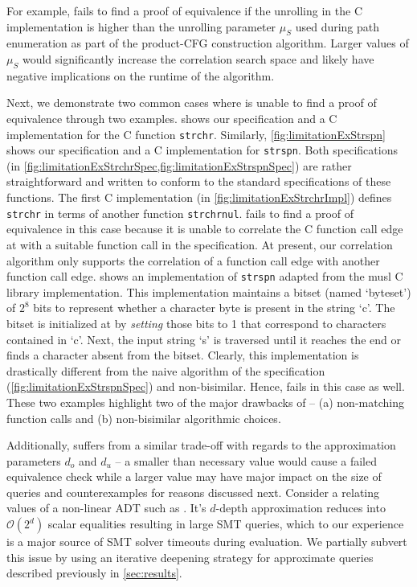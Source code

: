 For example, \toolName{} fails to find a proof of equivalence if the unrolling
in the C implementation is higher than the unrolling parameter $\mu_S$ used during path
enumeration as part of the product-CFG construction algorithm.
Larger values of $\mu_S$ would significantly increase the correlation search space and likely
have negative implications on the runtime of the algorithm.

Next, we demonstrate two common cases where \toolName{} is unable to find a proof of equivalence through two examples.
 shows our \SpecL{} specification and a C implementation for the C function {\tt strchr}.
Similarly, \cref{fig:limitationExStrspn} shows our \SpecL{} specification and a C implementation for {\tt strspn}.
Both specifications (in \cref{fig:limitationExStrchrSpec,fig:limitationExStrspnSpec}) are rather straightforward
and written to conform to the standard specifications of these functions.
The first C implementation (in \cref{fig:limitationExStrchrImpl}) defines {\tt strchr} in terms of another function {\tt strchrnul}.
\toolName{} fails to find a proof of equivalence in this case because it is unable to correlate the C function call edge at  with
a suitable function call in the specification. At present, our correlation algorithm only supports the correlation of a function call edge
with another function call edge.
 shows an implementation of {\tt strspn} adapted from the musl C library implementation.
This implementation maintains a bitset (named `byteset') of $2^{8}$ bits to represent whether a character byte is present in the string `c'.
The bitset is initialized at  by {\em setting} those bits to 1 that correspond to characters contained in `c'.
Next, the input string `s' is traversed until it reaches the end or finds a character absent from the bitset.
Clearly, this implementation is drastically different from the naive algorithm of the specification (\cref{fig:limitationExStrspnSpec})
and non-bisimilar. Hence, \toolName{} fails in this case as well.
These two examples highlight two of the major drawbacks of \toolName{} -- (a) non-matching function calls and (b) non-bisimilar algorithmic choices.

Additionally, \toolName{} suffers from a similar trade-off with regards to the approximation parameters $d_o$ and $d_u$
-- a smaller than necessary value would cause a failed equivalence check while a larger value may
have major impact on the size of queries and counterexamples for reasons discussed next.
Consider a \recursiveRelation{} relating values of a non-linear ADT such as .
It's $d$-depth approximation reduces into $\mathcal{O}(2^d)$ scalar equalities resulting in large SMT queries,
which to our experience is a major source of SMT solver timeouts during evaluation.
We partially subvert this issue by using an iterative deepening strategy for approximate queries described previously in \cref{sec:results}.

